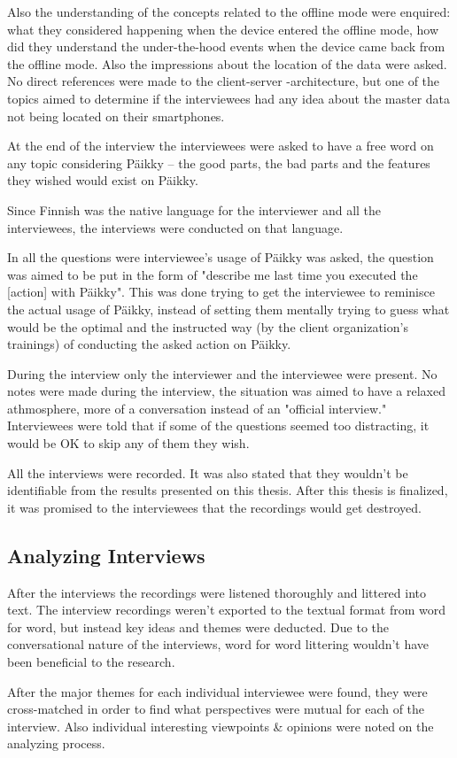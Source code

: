 Also the understanding of the concepts related to the offline mode were enquired: what they considered happening when the device entered the offline mode, how did they understand the under-the-hood events when the device came back from the offline mode. Also the impressions about the location of the data were asked. No direct references were made to the client-server -architecture, but one of the topics aimed to determine if the interviewees had any idea about the master data not being located on their smartphones.

At the end of the interview the interviewees were asked to have a free word on any topic considering Päikky – the good parts, the bad parts and the features they wished would exist on Päikky.

Since Finnish was the native language for the interviewer and all the interviewees, the interviews were conducted on that language.

In all the questions were interviewee's usage of Päikky was asked, the question was aimed to be put in the form of "describe me last time you executed the [action] with Päikky". This was done trying to get the interviewee to reminisce the actual usage of Päikky, instead of setting them mentally trying to guess what would be the optimal and the instructed way (by the client organization's trainings) of conducting the asked action on Päikky.

During the interview only the interviewer and the interviewee were present. No notes were made during the interview, the situation was aimed to have a relaxed athmosphere, more of a conversation instead of an "official interview." Interviewees were told that if some of the questions seemed too distracting, it would be OK to skip any of them they wish.

All the interviews were recorded.  It was also stated that they wouldn't be identifiable from the results presented on this thesis. After this thesis is finalized, it was promised to the interviewees that the recordings would get destroyed.




\subsection{Analyzing Interviews}

After the interviews the recordings were listened thoroughly and littered into text. The interview recordings weren't exported to the textual format from word for word, but instead key ideas and themes were deducted. Due to the conversational nature of the interviews, word for word littering wouldn't have been beneficial to the research. 

After the major themes for each individual interviewee were found, they were cross-matched in order to find what perspectives were mutual for each of the interview. Also individual interesting viewpoints & opinions were noted on the analyzing process.




